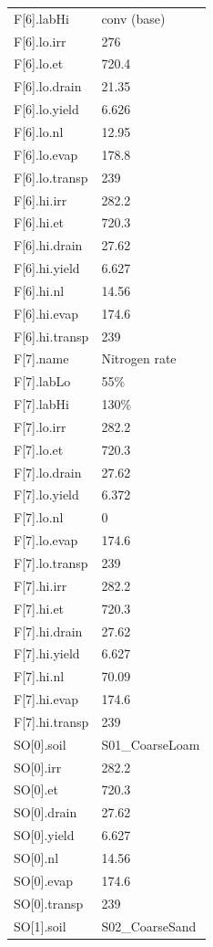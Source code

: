 {\begin{longtable}{p{}p{}}
{}F[6].labHi & conv (base)\\
{}F[6].lo.irr & 276\\
{}F[6].lo.et & 720.4\\
{}F[6].lo.drain & 21.35\\
{}F[6].lo.yield & 6.626\\
{}F[6].lo.nl & 12.95\\
{}F[6].lo.evap & 178.8\\
{}F[6].lo.transp & 239\\
{}F[6].hi.irr & 282.2\\
{}F[6].hi.et & 720.3\\
{}F[6].hi.drain & 27.62\\
{}F[6].hi.yield & 6.627\\
{}F[6].hi.nl & 14.56\\
{}F[6].hi.evap & 174.6\\
{}F[6].hi.transp & 239\\
{}F[7].name & Nitrogen rate\\
{}F[7].labLo & 55\%\\
{}F[7].labHi & 130\%\\
{}F[7].lo.irr & 282.2\\
{}F[7].lo.et & 720.3\\
{}F[7].lo.drain & 27.62\\
{}F[7].lo.yield & 6.372\\
{}F[7].lo.nl & 0\\
{}F[7].lo.evap & 174.6\\
{}F[7].lo.transp & 239\\
{}F[7].hi.irr & 282.2\\
{}F[7].hi.et & 720.3\\
{}F[7].hi.drain & 27.62\\
{}F[7].hi.yield & 6.627\\
{}F[7].hi.nl & 70.09\\
{}F[7].hi.evap & 174.6\\
{}F[7].hi.transp & 239\\
{}SO[0].soil & S01\_CoarseLoam\\
{}SO[0].irr & 282.2\\
{}SO[0].et & 720.3\\
{}SO[0].drain & 27.62\\
{}SO[0].yield & 6.627\\
{}SO[0].nl & 14.56\\
{}SO[0].evap & 174.6\\
{}SO[0].transp & 239\\
{}SO[1].soil & S02\_CoarseSand\\

\end{longtable}}

